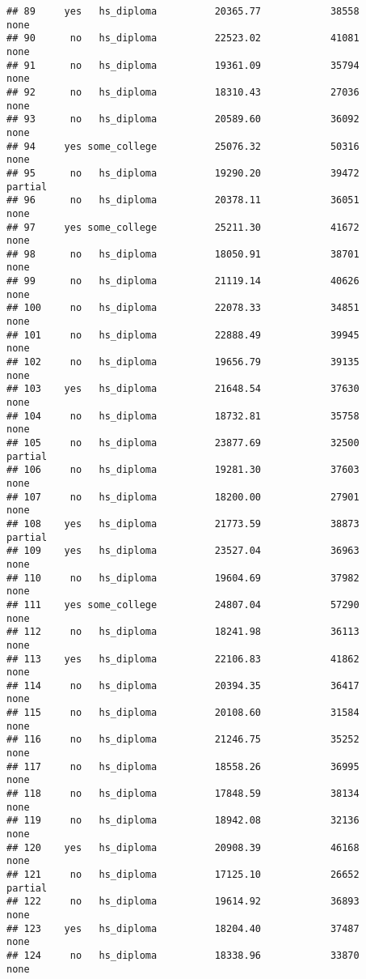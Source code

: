 \documentclass[
]{article}
\begin{document}
\begin{verbatim}
## 89     yes   hs_diploma          20365.77            38558        none
## 90      no   hs_diploma          22523.02            41081        none
## 91      no   hs_diploma          19361.09            35794        none
## 92      no   hs_diploma          18310.43            27036        none
## 93      no   hs_diploma          20589.60            36092        none
## 94     yes some_college          25076.32            50316        none
## 95      no   hs_diploma          19290.20            39472     partial
## 96      no   hs_diploma          20378.11            36051        none
## 97     yes some_college          25211.30            41672        none
## 98      no   hs_diploma          18050.91            38701        none
## 99      no   hs_diploma          21119.14            40626        none
## 100     no   hs_diploma          22078.33            34851        none
## 101     no   hs_diploma          22888.49            39945        none
## 102     no   hs_diploma          19656.79            39135        none
## 103    yes   hs_diploma          21648.54            37630        none
## 104     no   hs_diploma          18732.81            35758        none
## 105     no   hs_diploma          23877.69            32500     partial
## 106     no   hs_diploma          19281.30            37603        none
## 107     no   hs_diploma          18200.00            27901        none
## 108    yes   hs_diploma          21773.59            38873     partial
## 109    yes   hs_diploma          23527.04            36963        none
## 110     no   hs_diploma          19604.69            37982        none
## 111    yes some_college          24807.04            57290        none
## 112     no   hs_diploma          18241.98            36113        none
## 113    yes   hs_diploma          22106.83            41862        none
## 114     no   hs_diploma          20394.35            36417        none
## 115     no   hs_diploma          20108.60            31584        none
## 116     no   hs_diploma          21246.75            35252        none
## 117     no   hs_diploma          18558.26            36995        none
## 118     no   hs_diploma          17848.59            38134        none
## 119     no   hs_diploma          18942.08            32136        none
## 120    yes   hs_diploma          20908.39            46168        none
## 121     no   hs_diploma          17125.10            26652     partial
## 122     no   hs_diploma          19614.92            36893        none
## 123    yes   hs_diploma          18204.40            37487        none
## 124     no   hs_diploma          18338.96            33870        none

\end{verbatim}
\end{document}
